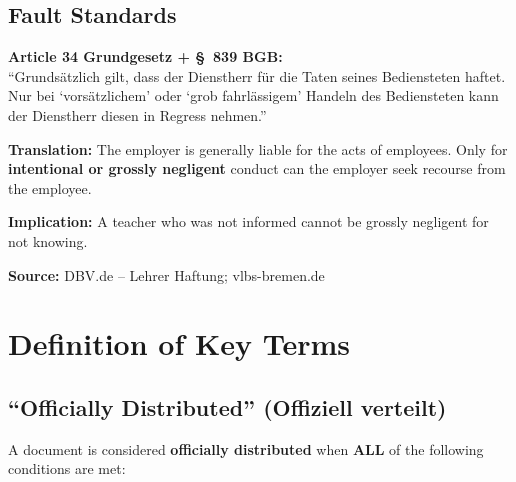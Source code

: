 \documentclass[11pt,a4paper]{article}
\begin{document}
\subsection{Fault Standards}

\begin{sourcebox}
\textbf{Article 34 Grundgesetz + \S~839 BGB:}\\
``Grundsätzlich gilt, dass der Dienstherr für die Taten seines Bediensteten haftet. Nur bei `vorsätzlichem' oder `grob fahrlässigem' Handeln des Bediensteten kann der Dienstherr diesen in Regress nehmen.''

\textbf{Translation:} The employer is generally liable for the acts of employees. Only for \textbf{intentional or grossly negligent} conduct can the employer seek recourse from the employee.

\textbf{Implication:} A teacher who was not informed cannot be grossly negligent for not knowing.

\textbf{Source:} DBV.de -- Lehrer Haftung; vlbs-bremen.de
\end{sourcebox}

\section{Definition of Key Terms}

\subsection{``Officially Distributed'' (Offiziell verteilt)}

\begin{successbox}
A document is considered \textbf{officially distributed} when \textbf{ALL} of the following conditions are met:
\end{successbox}
\end{document}

